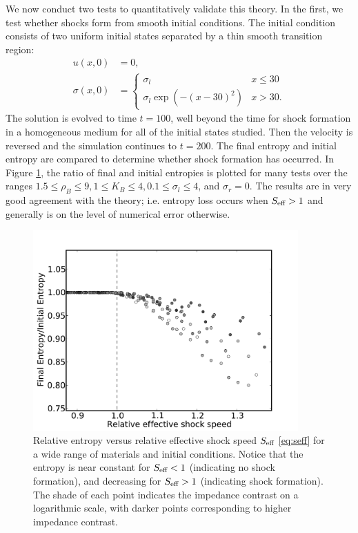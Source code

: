 We now conduct two tests to quantitatively validate this theory.
In the first, we test whether shocks form from smooth initial conditions.
The initial condition consists of
two uniform initial states separated by a thin smooth transition region:
\begin{align*}
u(x,0) & = 0, \\
\sigma(x,0) & = \begin{cases} \sigma_l & x \le 30 \\
                        \sigma_l \exp(-(x-30)^2) & x>30.
                \end{cases}
\end{align*}
The solution is evolved to time $t=100$, well beyond
the time for shock formation in a homogeneous medium for all of the initial
states studied.  Then the velocity
is reversed and the simulation continues to $t=200$.  The final entropy 
and initial entropy are compared to determine whether shock formation has
occurred.  In Figure \ref{fig:ent_cshock}, the ratio of final and initial 
entropies is plotted for many tests over the ranges 
$1.5\le\rho_B\le 9,1\le K_B \le 4,0.1\le\sigma_l\le4$, 
and $\sigma_r=0$.  The results are in very good agreement with the theory;
i.e. entropy loss occurs when $S_\textup{eff}>1$
and generally is on the level of numerical error otherwise.  

\begin{figure}
\centerline{
\includegraphics[width=4in]{figures/ent_cshock.pdf}}
\caption{Relative entropy versus relative effective shock speed $S_\textup{eff}$
\eqref{eq:seff} 
for a wide range of materials and initial conditions.  Notice that the 
entropy is near constant for $S_\textup{eff}<1$ (indicating
no shock formation), and decreasing for $S_\textup{eff}>1$ (indicating
shock formation).  The shade of each point indicates the impedance contrast
on a logarithmic scale, with darker points corresponding to higher impedance
contrast.
\label{fig:ent_cshock}}
\end{figure}


